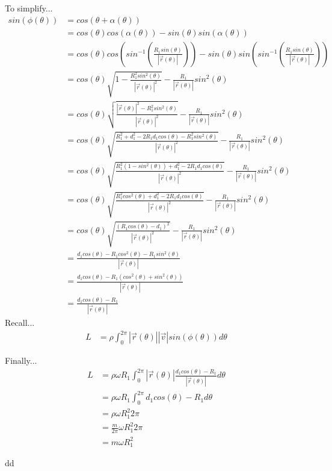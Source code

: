 \documentclass{article}
\begin{document}
	To simplify...
	\begin{align}
		sin(\phi(\theta)) &= cos(\theta + \alpha(\theta)) \\
		 &= cos(\theta)cos(\alpha(\theta)) - sin(\theta)sin(\alpha(\theta)) \\
		 &= cos(\theta)cos(sin^{-1}(\frac{R_1sin(\theta)}{|\vec{r}(\theta)|})) - sin(\theta)sin(sin^{-1}(\frac{R_1sin(\theta)}{|\vec{r}(\theta)|})) \\
		 &= cos(\theta)\sqrt{1-\frac{R_1^2sin^2(\theta)}{|\vec{r}(\theta)|^2}} - \frac{R_1}{|\vec{r}(\theta)|}sin^2(\theta) \\
		 &= cos(\theta)\sqrt{\frac{|\vec{r}(\theta)|^2 - R_1^2sin^2(\theta)}{|\vec{r}(\theta)|^2}} - \frac{R_1}{|\vec{r}(\theta)|}sin^2(\theta) \\
		 &= cos(\theta)\sqrt{\frac{R_1^2+d_1^2-2R_1d_1cos(\theta)- R_1^2sin^2(\theta)}{|\vec{r}(\theta)|^2}} - \frac{R_1}{|\vec{r}(\theta)|}sin^2(\theta) \\
		 &= cos(\theta)\sqrt{\frac{R_1^2(1-sin^2(\theta))+d_1^2-2R_1d_1cos(\theta)}{|\vec{r}(\theta)|^2}} - \frac{R_1}{|\vec{r}(\theta)|}sin^2(\theta) \\
		 &= cos(\theta)\sqrt{\frac{R_1^2cos^2(\theta)+d_1^2-2R_1d_1cos(\theta)}{|\vec{r}(\theta)|^2}} - \frac{R_1}{|\vec{r}(\theta)|}sin^2(\theta) \\
		 &= cos(\theta)\sqrt{\frac{(R_1cos(\theta) - d_1)^2}{|\vec{r}(\theta)|^2}} - \frac{R_1}{|\vec{r}(\theta)|}sin^2(\theta) \\
		 &= \frac{d_1cos(\theta) - R_1cos^2(\theta) - R_1sin^2(\theta)}{|\vec{r}(\theta)|} \\
		 &= \frac{d_1cos(\theta) - R_1(cos^2(\theta) + sin^2(\theta))}{|\vec{r}(\theta)|} \\
		 &= \frac{d_1cos(\theta) - R_1}{|\vec{r}(\theta)|}
	\end{align}
	Recall...
	\begin{align}
		L &= \rho\int_0^{2\pi}|\vec{r}(\theta)||\vec{v}|sin(\phi(\theta))d\theta
	\end{align}

	Finally...
	\begin{align}
		L &=\rho\omega R_1\int_0^{2\pi}|\vec{r}(\theta)|\frac{d_1cos(\theta) - R_1}{|\vec{r}(\theta)|}d\theta \\
		 &= \rho\omega R_1\int_0^{2\pi}d_1cos(\theta) - R_1 d\theta \\
		 &= \rho\omega R_1^2 2\pi \\
		 &= \frac{m}{2\pi} \omega R_1^2 2\pi  \\
		 &= m \omega R_1^2
	\end{align}

	dd
	
\end{document}
